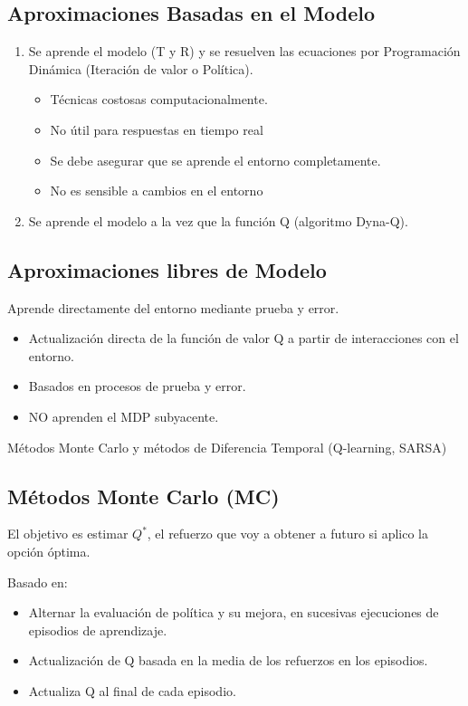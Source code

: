 \documentclass[12pt, twoside, openright]{report} %
\begin{document}
\subsection{Aproximaciones Basadas en el Modelo}
\begin{enumerate}
	\item Se aprende el modelo (T y R) y se resuelven las ecuaciones por Programación Dinámica (Iteración de valor o Política).
	      \begin{itemize}
		      \item Técnicas costosas computacionalmente.
		      \item No útil para respuestas en tiempo real
		      \item Se debe asegurar que se aprende el entorno completamente.
		      \item No es sensible a cambios en el entorno
	      \end{itemize}
	\item Se aprende el modelo a la vez que la función Q (algoritmo Dyna-Q).
\end{enumerate}

\subsection{Aproximaciones libres de Modelo}
Aprende directamente del entorno mediante prueba y error.
\begin{itemize}
	\item Actualización directa de la función de valor Q a partir de interacciones con el entorno.
	\item Basados en procesos de prueba y error.
	\item NO aprenden el MDP subyacente.
\end{itemize}
Métodos Monte Carlo y métodos de Diferencia Temporal (Q-learning, SARSA)

\subsection{Métodos Monte Carlo (MC)}
El objetivo es estimar $Q^*$, el refuerzo que voy a obtener a futuro si aplico la opción óptima.

Basado en:
\begin{itemize}
	\item Alternar la evaluación de política y su mejora, en sucesivas ejecuciones de episodios de aprendizaje.
	\item Actualización de Q basada en la media de los refuerzos en los episodios.
	\item Actualiza Q al final de cada episodio.
\end{itemize}
\end{document}
